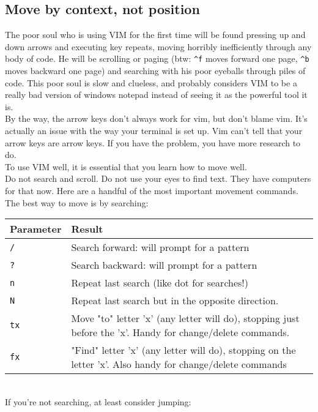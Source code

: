 \documentclass[a4paper, 12pt]{article}
\begin{document}
\subsection{Move by context, not position}
\label{"Move by context, not position"}
The poor soul who is using VIM for the first time will be found pressing up and down arrows and executing key repeats, moving horribly inefficiently through any body of code. He will be scrolling or paging (btw: {\tt \^{}f} moves forward one page, {\tt \^{}b} moves backward one page) and searching with his poor eyeballs through piles of code. This poor soul is slow and clueless, and probably considers VIM to be a really bad version of windows notepad instead of seeing it as the powerful tool it is.\\
By the way, the arrow keys don't always work for vim, but don't blame vim. It's actually an issue with the way your terminal is set up. Vim can't tell that your arrow keys are arrow keys. If you have the problem, you have more research to do.\\
To use VIM well, it is essential that you learn how to move well.\\
Do not search and scroll. Do not use your eyes to find text. They have computers for that now. Here are a handful of the most important movement commands. The best way to move is by searching:


\begin{tabular}{ l | p{9cm}}
  {\bf Parameter} & {\bf Result} \\ \hline
  {\tt /} & Search forward: will prompt for a pattern\\
  {\tt ?} & Search backward: will prompt for a pattern \\
  {\tt n} & Repeat last search (like dot for searches!)\\
  {\tt N} & Repeat last search but in the opposite direction.\\
  {\tt tx} & Move "to" letter 'x' (any letter will do), stopping just before the 'x'. Handy for change/delete commands.\\
  {\tt fx} & "Find" letter 'x' (any letter will do), stopping on the letter 'x'. Also handy for change/delete commands  \\ \hline
\end{tabular}\\

\noindent
If you're not searching, at least consider jumping:
\end{document}

